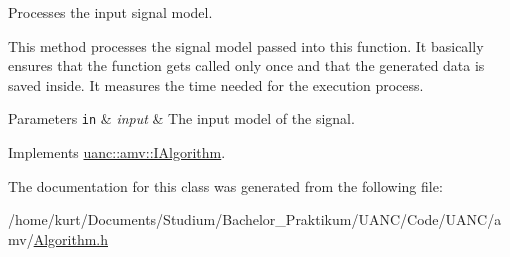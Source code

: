 Processes the input signal model. 

This method processes the signal model passed into this function. It basically ensures that the function gets called only once and that the generated data is saved inside. It measures the time needed for the execution process.


\begin{DoxyParams}[1]{Parameters}
\mbox{\tt in}  & {\em input} & The input model of the signal. \\
\hline
\end{DoxyParams}


Implements \hyperlink{classuanc_1_1amv_1_1_i_algorithm_a14dd1e42a421c48b8874e42933daa0b9}{uanc\+::amv\+::\+I\+Algorithm}.



The documentation for this class was generated from the following file\+:\begin{DoxyCompactItemize}
\item 
/home/kurt/\+Documents/\+Studium/\+Bachelor\+\_\+\+Praktikum/\+U\+A\+N\+C/\+Code/\+U\+A\+N\+C/amv/\hyperlink{_algorithm_8h}{Algorithm.\+h}\end{DoxyCompactItemize}
